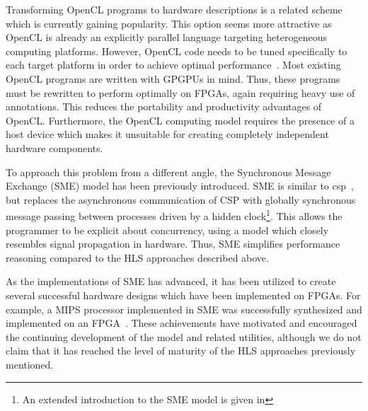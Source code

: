 Transforming OpenCL programs to hardware descriptions is a related scheme which
is currently gaining popularity. This option seems more attractive as OpenCL is
already an explicitly parallel language targeting heterogeneous computing
platforms. However, OpenCL code needs to be tuned specifically to each target
platform in order to achieve optimal performance~\cite{chen2012using}. Most
existing OpenCL programs are written with GPGPUs in mind. Thus, these programs
must be rewritten to perform optimally on FPGAs, again requiring heavy use of
annotations. This reduces the portability and productivity advantages of OpenCL.
Furthermore, the OpenCL computing model requires the presence of a host device
which makes it unsuitable for creating completely independent hardware
components.

To approach this problem from a different angle, the Synchronous Message
Exchange (SME) model\cite{vinter2015bus,vinter2014synchronous} has been
previously introduced. SME is similar to \gls{csp}~\cite{csp}, but replaces the
asynchronous communication of CSP with globally synchronous message passing
between processes driven by a hidden clock\footnote{An extended introduction to
  the SME model is given in }.
This allows the programmer to be explicit about concurrency, using a model which
closely resembles signal propagation in hardware. Thus, SME simplifies
performance reasoning compared to the HLS approaches described above.

As the implementations of SME has advanced, it has been utilized to create
several successful hardware designs which have been implemented on FPGAs. For
example, a MIPS processor implemented in SME was successfully synthesized and
implemented on an FPGA~\cite{johnsen2017thesis}. These achievements have
motivated and encouraged the continuing development of the model and related
utilities, although we do not claim that it has reached the level of maturity of
the HLS approaches previously mentioned.

